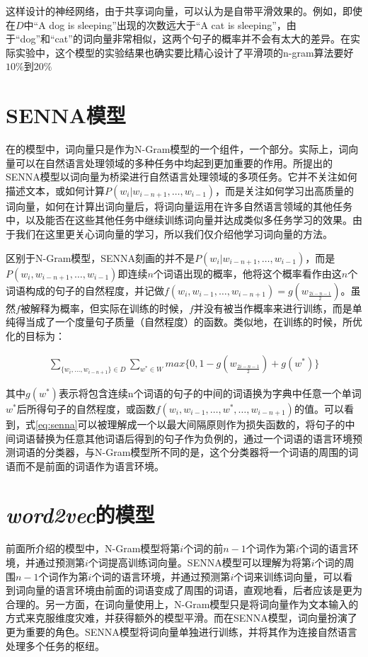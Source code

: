 这样设计的神经网络，由于共享词向量，可以认为是自带平滑效果的。例如，即使在$D$中``A dog is sleeping''出现的次数远大于``A cat is sleeping''，由于``dog''和``cat''的词向量非常相似，这两个句子的概率并不会有太大的差异。在实际实验中，这个模型的实验结果也确实要比精心设计了平滑项的n-gram算法要好$10\%$到$20\%$

\section{SENNA模型}
\label{sec:senna}
在\cite{bengio2006neural}的模型中，词向量只是作为N-Gram模型的一个组件，一个部分。实际上，词向量可以在自然语言处理领域的多种任务中均起到更加重要的作用。\citep{collobert2011natural}所提出的SENNA模型以词向量为桥梁进行自然语言处理领域的多项任务。它并不关注如何描述文本，或如何计算$P(w_i|w_{i-n+1}, \dots , w_{i-1})$，而是关注如何学习出高质量的词向量，如何在计算出词向量后，将词向量运用在许多自然语言领域的其他任务中，以及能否在这些其他任务中继续训练词向量并达成类似多任务学习的效果。由于我们在这里更关心词向量的学习，所以我们仅介绍他学习词向量的方法。

区别于N-Gram模型，SENNA刻画的并不是$P(w_i|w_{i-n+1}, \dots , w_{i-1})$，而是$P(w_i, w_{i-n+1}, \dots , w_{i-1})$即连续$n$个词语出现的概率，他将这个概率看作由这$n$个词语构成的句子的自然程度，并记做$f(w_i, w_{i-1}, \dots , w_{i-n+1}) = g(w_{\frac{2i-n-1}{2}})$。虽然$f$被解释为概率，但实际在训练的时候，$f$并没有被当作概率来进行训练，而是单纯得当成了一个度量句子质量（自然程度）的函数。类似地，在训练的时候，所优化的目标为：

\begin{eqnarray}
\label{eq:senna}
\sum_{\{w_i, \dots, w_{i-n+1}\} \in D} \sum_{w^* \in W} max\{0, 1 - g(w_{\frac{2i-n-1}{2}}) + g(w^*) \}
\end{eqnarray}

其中$g(w^*)$表示将包含连续n个词语的句子的中间的词语换为字典中任意一个单词$w^*$后所得句子的自然程度，或函数$f(w_i, w_{i-1}, \dots , w^*, \dots , w_{i-n+1})$的值。可以看到，式\ref{eq:senna}可以被理解成一个以最大间隔原则作为损失函数的，将句子的中间词语替换为任意其他词语后得到的句子作为负例的，通过一个词语的语言环境预测词语的分类器，与N-Gram模型所不同的是，这个分类器将一个词语的周围的词语而不是前面的词语作为语言环境。

\section{\emph{word2vec}的模型}

前面所介绍的模型中，N-Gram模型将第$i$个词的前$n-1$个词作为第$i$个词的语言环境，并通过预测第$i$个词提高训练词向量。SENNA模型可以理解为将第$i$个词的周围$n-1$个词作为第$i$个词的语言环境，并通过预测第$i$个词来训练词向量，可以看到词向量的语言环境由前面的词语变成了周围的词语，直观地看，后者应该是更为合理的。另一方面，在词向量使用上，N-Gram模型只是将词向量作为文本输入的方式来克服维度灾难，并获得额外的模型平滑。而在SENNA模型，词向量扮演了更为重要的角色。SENNA模型将词向量单独进行训练，并将其作为连接自然语言处理多个任务的枢纽。

